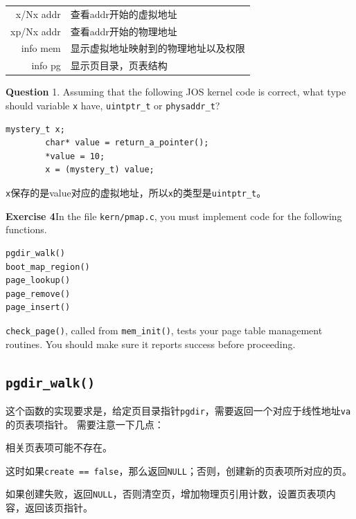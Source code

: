 \documentclass[11pt]{article}
\newenvironment{packed_enum}{
\begin{enumerate}
  \setlength{\itemsep}{1pt}
  \setlength{\parskip}{0pt}
  \setlength{\parsep}{0pt}
}{\end{enumerate}}
\begin{document}
\begin{center}
\begin{tabular}{rl}
x/Nx addr & 查看addr开始的虚拟地址 \\
xp/Nx addr & 查看addr开始的物理地址 \\
info mem & 显示虚拟地址映射到的物理地址以及权限 \\
info pg & 显示页目录，页表结构
\end{tabular}
\end{center}

\begin{framed}
\textbf{Question}
1. Assuming that the following JOS kernel code is correct, what type should variable \lstinline|x| have, \lstinline|uintptr_t| or \lstinline|physaddr_t|?
\begin{lstlisting}[frame=none,aboveskip=-1.5em]
    	mystery_t x;
    	char* value = return_a_pointer();
    	*value = 10;
    	x = (mystery_t) value;
\end{lstlisting}
\end{framed}
\lstinline|x|保存的是value对应的虚拟地址，所以\lstinline|x|的类型是\lstinline|uintptr_t|。

\begin{framed}
\noindent\textbf{Exercise 4}In the file \lstinline|kern/pmap.c|, you must implement code for the following functions.
\begin{lstlisting}[frame=none,aboveskip=-1.5em]
pgdir_walk()
boot_map_region()
page_lookup()
page_remove()
page_insert()
\end{lstlisting}
\lstinline|check_page()|, called from \lstinline|mem_init()|, tests your page table management routines. You should make sure it reports success before proceeding.
\end{framed}

\subsection{\lstinline|pgdir_walk()|}
这个函数的实现要求是，给定页目录指针\lstinline|pgdir|，需要返回一个对应于线性地址\lstinline|va|的页表项指针。
需要注意一下几点：
\begin{packed_enum}
\item 相关页表项可能不存在。
\item 这时如果\lstinline|create == false|，那么返回\lstinline|NULL|；否则，创建新的页表项所对应的页。
\item 如果创建失败，返回\lstinline|NULL|，否则清空页，增加物理页引用计数，设置页表项内容，返回该页指针。
\end{packed_enum}
\end{document}
